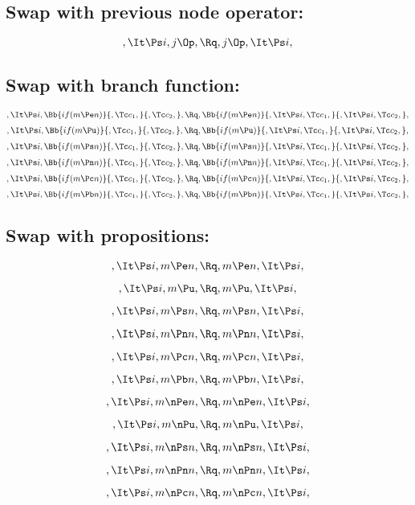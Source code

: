 \subsection{Swap with previous node operator:}
\[,\It \Ps i, j \Op, \Rq ,j \Op, \It \Ps i,\]

\bigskip
\bigskip
\subsection{Swap with branch function:}
\[,\It \Ps i, \Bb{if(m \Pe n)}{,\Tc c_1,}{,\Tc c_2,}, \Rq , \Bb{if(m \Pe n)}{,\It \Ps i, \Tc c_1,}{,\It \Ps i, \Tc c_2,},\]
\bigskip
\bigskip
\[,\It \Ps i, \Bb{if(m \Pu)}{,\Tc c_1,}{,\Tc c_2,}, \Rq , \Bb{if(m \Pu)}{,\It \Ps i, \Tc c_1,}{,\It \Ps i, \Tc c_2,},\]
\bigskip
\bigskip
\[,\It \Ps i, \Bb{if(m \Ps n)}{,\Tc c_1,}{,\Tc c_2,}, \Rq , \Bb{if(m \Ps n)}{,\It \Ps i, \Tc c_1,}{,\It \Ps i, \Tc c_2,},\]
\bigskip
\bigskip
\[,\It \Ps i, \Bb{if(m \Pn n)}{,\Tc c_1,}{,\Tc c_2,}, \Rq , \Bb{if(m \Pn n)}{,\It \Ps i, \Tc c_1,}{,\It \Ps i, \Tc c_2,},\]
\bigskip
\bigskip
\[,\It \Ps i, \Bb{if(m \Pc n)}{,\Tc c_1,}{,\Tc c_2,}, \Rq , \Bb{if(m \Pc n)}{,\It \Ps i, \Tc c_1,}{,\It \Ps i, \Tc c_2,},\]
\bigskip
\bigskip
\[,\It \Ps i, \Bb{if(m \Pb n)}{,\Tc c_1,}{,\Tc c_2,}, \Rq , \Bb{if(m \Pb n)}{,\It \Ps i, \Tc c_1,}{,\It \Ps i, \Tc c_2,},\]


\bigskip
\bigskip
\subsection{Swap with propositions:}
\[,\It \Ps i, m \Pe n, \Rq , m \Pe n, \It \Ps i,\]

\[,\It \Ps i, m \Pu, \Rq , m \Pu, \It \Ps i,\]

\[,\It \Ps i, m \Ps n, \Rq , m \Ps n, \It \Ps i,\]

\[,\It \Ps i, m \Pn n, \Rq , m \Pn n, \It \Ps i,\]

\[,\It \Ps i, m \Pc n, \Rq , m \Pc n, \It \Ps i,\]

\[,\It \Ps i, m \Pb n, \Rq , m \Pb n, \It \Ps i,\]

\[,\It \Ps i, m \nPe n, \Rq , m \nPe n, \It \Ps i,\]

\[,\It \Ps i, m \nPu, \Rq , m \nPu, \It \Ps i,\]

\[,\It \Ps i, m \nPs n, \Rq , m \nPs n, \It \Ps i,\]

\[,\It \Ps i, m \nPn n, \Rq , m \nPn n, \It \Ps i,\]

\[,\It \Ps i, m \nPc n, \Rq , m \nPc n, \It \Ps i,\]

